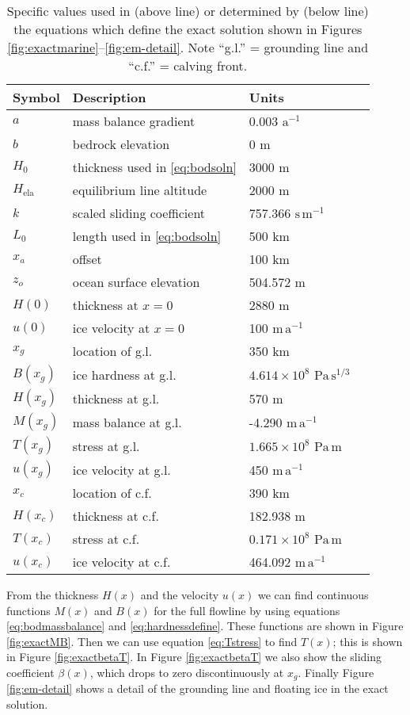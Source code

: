 \documentclass[review,letterpaper]{igs}
\newcommand{\Hela}{H_{\text{ela}}}
\begin{document}
\begin{table}
\caption{Specific values used in (above line) or determined by (below line) the equations which define the exact solution shown in Figures \ref{fig:exactmarine}--\ref{fig:em-detail}.  Note ``g.l.'' = grounding line and ``c.f.'' = calving front.}\label{tab:exactsoln}

\medskip
\begin{tabular}{llll}
Symbol & Description & Units \\ \hline
$a$ & mass balance gradient & 0.003 $\text{a}^{-1}$ \\
$b$ & bedrock elevation & 0 m \\
$H_0$ & thickness used in \eqref{eq:bodsoln} & 3000 m  \\
$\Hela$ & equilibrium line altitude & 2000 m  \\
$k$ & scaled sliding coefficient & 757.366 $\text{s}\,\text{m}^{-1}$ \\
$L_0$ & length used in \eqref{eq:bodsoln} & 500 km  \\
$x_a$ & offset & 100 km  \\
$z_o$ & ocean surface elevation & 504.572 m \\
$H(0)$ & thickness at $x=0$ & 2880 m  \\
$u(0)$ & ice velocity at $x=0$ & 100 $\text{m}\,\text{a}^{-1}$  \\ \hline
$x_g$ & location of g.l. & 350 km  \\
$B(x_g)$ & ice hardness at g.l. & $4.614 \times 10^{8}$ $\text{Pa}\,\text{s}^{1/3}$  \\
$H(x_g)$ & thickness at g.l. & 570 m  \\
$M(x_g)$ & mass balance at g.l. & -4.290 $\text{m}\,\text{a}^{-1}$  \\
$T(x_g)$ & stress at g.l. & $1.665 \times 10^{8}$ $\text{Pa}\,\text{m}$  \\
$u(x_g)$ & ice velocity at g.l. & 450 $\text{m}\,\text{a}^{-1}$  \\
$x_c$ & location of c.f. & 390 km  \\
$H(x_c)$ & thickness at c.f. & 182.938 m  \\
$T(x_c)$ & stress at c.f. & $0.171 \times 10^{8}$ $\text{Pa}\,\text{m}$  \\
$u(x_c)$ & ice velocity at c.f. & 464.092 $\text{m}\,\text{a}^{-1}$  \\
\end{tabular}
\end{table}

From the thickness $H(x)$ and the velocity $u(x)$ we can find continuous functions $M(x)$ and $B(x)$ for the full  flowline by using equations \eqref{eq:bodmassbalance} and \eqref{eq:hardnessdefine}.  These functions are shown in Figure \ref{fig:exactMB}.  Then we can use equation \eqref{eq:Tstress} to find $T(x)$; this is shown in Figure \ref{fig:exactbetaT}.  In Figure \ref{fig:exactbetaT} we also show the sliding coefficient $\beta(x)$, which drops to zero discontinuously at $x_g$.  Finally Figure \ref{fig:em-detail} shows a detail of the grounding line and floating ice in the exact solution.
\end{document}
